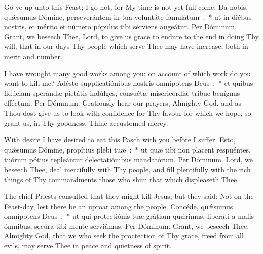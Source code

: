 {{  
  {Go ye up unto this Feast; I go not, for My time is not yet full come.}
  {Da nobis, quǽsumus Dómine, perseverántem in tua voluntáte famulátum~:~* ut in diébus nostris, et mérito et número pópulus tibi sérviens augeátur. Per Dóminum.}
  {Grant, we beseech Thee, Lord, to give us grace to endure to the end in doing Thy will, that in our days Thy people which serve Thee may have increase, both in merit and number.}

  {I have wrought many good works among you: on account of which work do you want to kill me?}
  {Adésto supplicatiónibus nostris omnípotens Deus~:~* et quibus fidúciam sperándæ pietátis indúlges, consuétæ misericórdiæ tríbue benígnus efféctum. Per Dóminum.}
  {Gratiously hear our prayers, Almighty God, and as Thou dost give us to look with confidence for Thy favour for which we hope, so grant us, in Thy goodness, Thine accustomed mercy.}

  {With desire I have desired to eat this Pasch with you before I suffer.}
  {Esto, quǽsumus Dómine, propítius plebi tuæ~:~* ut quæ tibi non placent respuéntes, tuórum pótius repleántur delectatiónibus mandatórum. Per Dóminum.}
  {Lord, we beseech Thee, deal mercifully with Thy people, and fill plentifully with the rich things of Thy commandments those who shun that which displeaseth Thee.}

  \let\vrtitle=\undefined
  {The chief Priests consulted that they might kill Jesus, but they said: Not on the Feast-day, lest there be an uproar among the people.}
  {Concéde, quǽsumus omnípotens Deus~:~* ut qui protectiónis tuæ grátiam quǽrimus, liberáti a malis ómnibus, secúra tibi mente serviámus. Per Dóminum.}
  {Grant, we beseech Thee, Almighty God, that we who seek the proctection of Thy grace, freed from all evils, may serve Thee in peace and quietness of spirit.}
}
}
